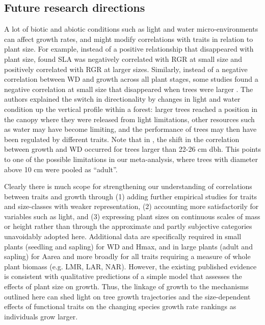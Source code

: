 \documentclass[a4paper,11pt]{article}
\begin{document}
\subsection*{Future research directions}

A lot of biotic and abiotic conditions such as light and water micro-environments can affect growth rates, and might modify correlations with traits in relation to plant size. For example, instead of a positive relationship that disappeared with plant size, \citet{Iida:2014ep} found SLA was negatively correlated with RGR at small size and positively correlated with RGR at larger sizes. Similarly, instead of a negative correlation between WD and growth across all plant stages, some studies found a negative correlation at small size that disappeared when trees were larger \citep{Iida:2014ep,Iida:2014hq}. The authors explained the switch in directionality by changes in light and water condition up the vertical profile within a forest: larger trees reached a position in the canopy where they were released from light limitations, other resources such as water may have become limiting, and the performance of trees may then have been regulated by different traits. Note that in \citet{Iida:2014hq}, the shift in the correlation between growth and WD occurred for trees larger than 22-26 cm dbh. This points to one of the possible limitations in our meta-analysis, where trees with diameter above 10 cm were pooled as ``adult''.

Clearly there is much scope for strengthening our understanding of correlations between traits and growth through (1) adding further empirical studies for traits and size-classes with weaker representation, (2) accounting more satisfactorily for variables such as light, and (3) expressing plant sizes on continuous scales of mass or height rather than through the approximate and partly subjective categories unavoidably adopted here. Additional data are specifically required in small plants (seedling and sapling) for WD and Hmax, and in large plants (adult and sapling) for Aarea and more broadly for all traits requiring a measure of whole plant biomass (e.g. LMR, LAR, NAR). However, the existing published evidence is consistent with qualitative predictions of a simple model that assesses the effects of plant size on growth. Thus, the linkage of growth to the mechanisms outlined here can shed light on tree growth trajectories and the size-dependent effects of functional traits on the changing species growth rate rankings as individuals grow larger.
\end{document}
